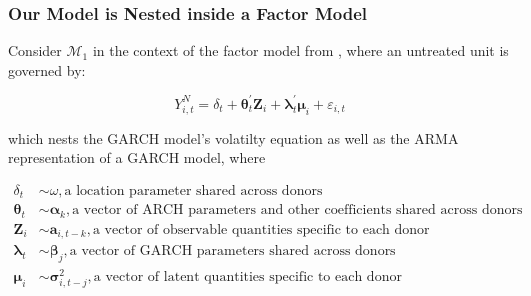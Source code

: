 \documentclass[9pt]{beamer}
\def\mc#1{\mathcal{#1}} %
\def\mc#1{\mathcal{#1}}
\theoremstyle{definition}
\begin{document}
\begin{frame}
\frametitle{Our Model is Nested inside a Factor Model}

\fontsize{6}{7.2}

Consider $\mc{M}_{1}$ in the context of the factor model from \cite[][]{abadie2010synthetic}, where an untreated unit is governed by:

$$Y^{N}_{i,t} = \delta_{t} + \boldsymbol\theta_{t}^{'}\textbf{Z}_{i}+\boldsymbol\lambda_{t}^{'}\boldsymbol\mu_{i}+\varepsilon_{i,t}$$

which nests the GARCH model's volatilty equation as well as the ARMA representation of a GARCH model, where

\begin{align*}
\delta_{t} & \sim \omega, \text{a location parameter shared across donors}\\
\boldsymbol\theta_{t} & \sim \boldsymbol\alpha_{k}, \text{a vector of ARCH parameters and other coefficients shared across donors} \\
\textbf{Z}_{i} & \sim \boldsymbol a_{i,t-k}, \text{a vector of observable quantities specific to each donor} \\
\boldsymbol \lambda_{t} & \sim \boldsymbol\beta_{j}, \text{a vector of GARCH parameters shared across donors} \\
\boldsymbol \mu_{i} & \sim \boldsymbol \sigma_{i,t-j}^{2}, \text{a vector of latent quantities specific to each donor}   \\
\end{align*}

\end{frame}
\end{document}
